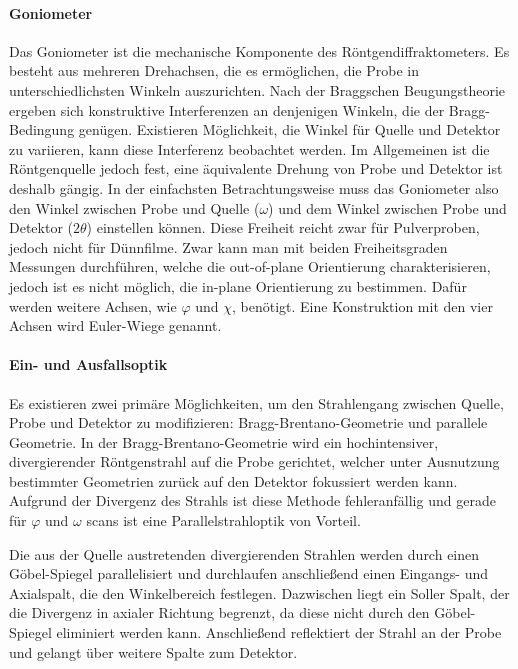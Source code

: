 \paragraph{Goniometer}
Das Goniometer ist die mechanische Komponente des Röntgendiffraktometers.
Es besteht aus mehreren Drehachsen, die es ermöglichen, die Probe in unterschiedlichsten Winkeln auszurichten.
Nach der Braggschen Beugungstheorie ergeben sich konstruktive Interferenzen an denjenigen Winkeln, die der
Bragg-Bedingung genügen.
Existieren Möglichkeit, die Winkel für Quelle und Detektor zu variieren, kann diese Interferenz beobachtet werden.
Im Allgemeinen ist die Röntgenquelle jedoch fest, eine äquivalente Drehung von Probe und Detektor ist deshalb gängig.
In der einfachsten Betrachtungsweise muss das Goniometer also den Winkel zwischen Probe und Quelle ($\omega$) und dem
Winkel zwischen Probe und Detektor ($2\theta$) einstellen können.
Diese Freiheit reicht zwar für Pulverproben, jedoch nicht für Dünnfilme.
Zwar kann man mit beiden Freiheitsgraden Messungen durchführen, welche die out-of-plane Orientierung charakterisieren,
jedoch ist es nicht möglich, die in-plane Orientierung zu bestimmen.
Dafür werden weitere Achsen, wie $\varphi$ und $\chi$, benötigt.
Eine Konstruktion mit den vier Achsen wird Euler-Wiege genannt.

\paragraph{Ein- und Ausfallsoptik}
Es existieren zwei primäre Möglichkeiten, um den Strahlengang zwischen Quelle, Probe und Detektor zu modifizieren:
Bragg-Brentano-Geometrie und parallele Geometrie.
In der Bragg-Brentano-Geometrie wird ein hochintensiver, divergierender Röntgenstrahl auf die Probe gerichtet,
welcher unter Ausnutzung bestimmter Geometrien zurück auf den Detektor fokussiert werden kann.
Aufgrund der Divergenz des Strahls ist diese Methode fehleranfällig und gerade für $\varphi$ und $\omega$ scans
ist eine Parallelstrahloptik von Vorteil.

Die aus der Quelle austretenden divergierenden Strahlen werden durch einen Göbel-Spiegel
parallelisiert und durchlaufen anschließend einen Eingangs- und Axialspalt, die den Winkelbereich
festlegen.
Dazwischen liegt ein Soller Spalt, der die Divergenz in axialer Richtung begrenzt, da diese
nicht durch den Göbel-Spiegel eliminiert werden kann.
Anschließend reflektiert der Strahl an der Probe und gelangt über weitere Spalte zum Detektor.

